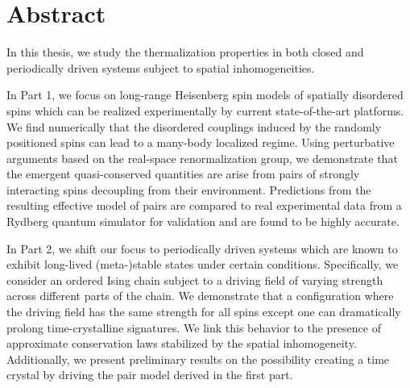 \begingroup
\let\clearpage\relax
\let\cleardoublepage\relax
\let\cleardoublepage\relax

\chapter*{Abstract}

In this thesis, we study the thermalization properties in both closed and periodically driven systems subject to spatial inhomogeneities. 

In Part 1, we focus on long-range Heisenberg spin models of spatially disordered spins which can be realized experimentally by current state-of-the-art platforms.
We find numerically that the disordered couplings induced by the randomly positioned spins can lead to a many-body localized regime. Using perturbative arguments based on the real-space renormalization group, we demonstrate that the emergent quasi-conserved quantities are arise from pairs of strongly interacting spins decoupling from their environment. Predictions from the resulting effective model of pairs are compared to real experimental data from a Rydberg quantum simulator for validation and are found to be highly accurate.

In Part 2, we shift our focus to periodically driven systems which are known to exhibit long-lived (meta-)stable states under certain conditions. Specifically, we consider an ordered Ising chain subject to a driving field of varying strength across different parts of the chain. We demonstrate that a configuration where the driving field has the same strength for all spins except one can dramatically prolong time-crystalline signatures. We link this behavior to the presence of approximate conservation laws stabilized by the spatial inhomogeneity. Additionally, we present preliminary results on the possibility creating a time crystal by driving the pair model derived in the first part.

